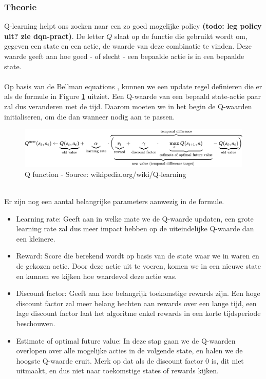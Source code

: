 \documentclass[11pt]{article}
\begin{document}
\subsubsection{Theorie}
Q-learning helpt ons zoeken naar een zo goed mogelijke policy \textbf{(todo: leg policy uit? zie dqn-pract)}. De letter $Q$ slaat op de functie die gebruikt wordt om, gegeven een state en een actie, de waarde van deze combinatie te vinden. Deze waarde geeft aan hoe goed - of slecht - een bepaalde actie is in een bepaalde state.\\\\
Op basis van de Bellman equations \cite{bellman-equations}, kunnen we een update regel definieren die er als de formule in Figure \ref{fig:qfunction} uitziet. Een Q-waarde van een bepaald state-actie paar zal dus veranderen met de tijd. Daarom moeten we in het begin de Q-waarden initialiseren, om die dan wanneer nodig aan te passen.\\
\begin{figure}[h]
\centering
\includegraphics[scale=0.70]{images/qformula.png}
\caption{Q function - Source: wikipedia.org/wiki/Q-learning}
\label{fig:qfunction}
\end{figure} \\
Er zijn nog een aantal belangrijke parameters aanwezig in de formule. 
\begin{itemize}
	\item Learning rate: Geeft aan in welke mate we de Q-waarde updaten, een grote learning rate zal dus meer impact hebben op de uiteindelijke Q-waarde dan een kleinere.
	\item Reward: Score die berekend wordt op basis van de state waar we in waren en de gekozen actie. Door deze actie uit te voeren, komen we in een nieuwe state en kunnen we kijken hoe waardevol deze actie was. 
	\item Discount factor: Geeft aan hoe belangrijk toekomstige rewards zijn. Een hoge discount factor zal meer belang hechten aan rewards over een lange tijd, een lage discount factor laat het algoritme enkel rewards in een korte tijdsperiode beschouwen.
	\item Estimate of optimal future value: In deze stap gaan we de Q-waarden overlopen over alle mogelijke acties in de volgende state, en halen we de hoogste Q-waarde eruit. Merk op dat als de discount factor 0 is, dit niet uitmaakt, en dus niet naar toekomstige states of rewards kijken.
\end{itemize}
\end{document}
